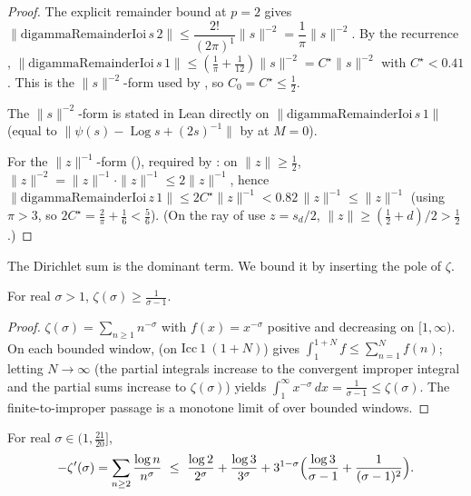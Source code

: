 \begin{proof}
\leanok
The explicit remainder bound
 at $p=2$ gives
$\|\mathrm{digammaRemainderIoi}\,s\,2\|\le\dfrac{2!}{(2\pi)^{1}}\|s\|^{-2}=\dfrac1\pi\|s\|^{-2}$.
By the recurrence ,
$\|\mathrm{digammaRemainderIoi}\,s\,1\|\le(\tfrac1\pi+\tfrac1{12})\|s\|^{-2}=C^{\star}\|s\|^{-2}$
with $C^{\star}<0.41$. This is the $\|s\|^{-2}$-form used by
, so $C_0=C^{\star}\le\tfrac12$.

The $\|s\|^{-2}$-form is stated in Lean directly on $\|\mathrm{digammaRemainderIoi}\,s\,1\|$
(equal to $\|\psi(s)-\operatorname{Log}s+(2s)^{-1}\|$ by
 at $M=0$).

For the $\|z\|^{-1}$-form
(), required by
: on $\|z\|\ge\tfrac12$,
$\|z\|^{-2}=\|z\|^{-1}\cdot\|z\|^{-1}\le 2\|z\|^{-1}$, hence
$\|\mathrm{digammaRemainderIoi}\,z\,1\|\le 2C^{\star}\|z\|^{-1}<0.82\,\|z\|^{-1}\le\|z\|^{-1}$
(using $\pi>3$, so $2C^{\star}=\tfrac2\pi+\tfrac16<\tfrac56$).
(On the ray of use $z=s_d/2$, $\|z\|\ge(\tfrac12+d)/2>\tfrac12$.)
\end{proof}

The Dirichlet sum is the dominant term. We bound it by inserting the pole of $\zeta$.

\begin{lemma}
\label{lem:le_zeta_pole_lower}
\leanok
For real $\sigma>1$, $\displaystyle\zeta(\sigma)\ge\frac1{\sigma-1}$.
\end{lemma}

\begin{proof}
\leanok
$\zeta(\sigma)=\sum_{n\ge1}n^{-\sigma}$ with $f(x)=x^{-\sigma}$ positive and decreasing on
$[1,\infty)$. On each bounded window, 
(on $\mathrm{Icc}\ 1\ (1+N)$) gives $\int_1^{1+N}f\le\sum_{n=1}^{N}f(n)$; letting
$N\to\infty$ (the partial integrals increase to the convergent improper integral and
the partial sums increase to $\zeta(\sigma)$) yields
$\int_1^\infty x^{-\sigma}\,dx=\tfrac1{\sigma-1}\le\zeta(\sigma)$. The finite-to-improper
passage is a monotone limit of  over bounded windows.
\end{proof}

\begin{lemma}
\label{lem:le_neg_deriv_zeta}
\leanok
For real $\sigma\in(1,\tfrac{21}{20}]$,
\[
  -\zeta'(\sigma)=\sum_{n\ge2}\frac{\log n}{n^{\sigma}}
  \ \le\ \frac{\log2}{2^{\sigma}}+\frac{\log3}{3^{\sigma}}
        +3^{1-\sigma}\Bigl(\frac{\log3}{\sigma-1}+\frac1{(\sigma-1)^2}\Bigr).
\]
\end{lemma}

